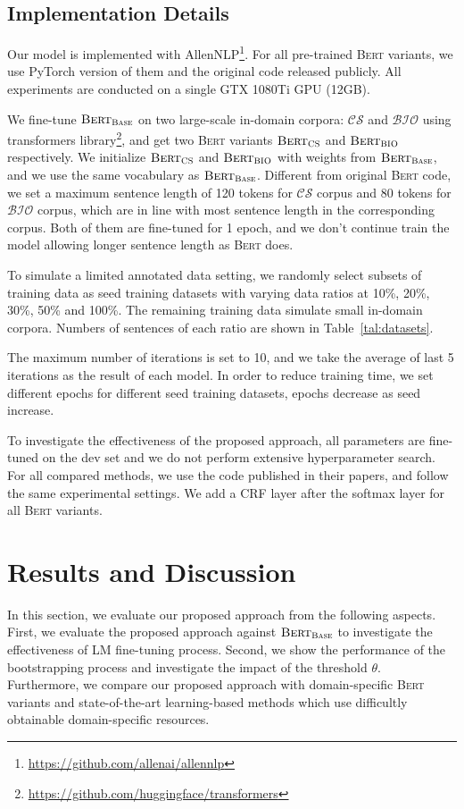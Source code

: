 \documentclass[10pt, conference, compsocconf]{IEEEtran}
\newcommand{\bert}{\textsc{Bert}\xspace}
\newcommand{\bio}{$\mathcal{BIO}$\xspace}
\newcommand{\cs}{$\mathcal{CS}$\xspace}
\newcommand{\bertcs}{$\bert_{\textsc{CS}}$\xspace}
\newcommand{\bertbio}{$\bert_{\textsc{BIO}}$\xspace}
\newcommand{\bertbase}{$\bert_{\textsc{Base}}$\xspace}
\begin{document}
\subsection{Implementation Details}
Our model is implemented with AllenNLP\footnote{\url{https://github.com/allenai/allennlp}}.
For all pre-trained \bert variants, we use PyTorch version of them and the 
original code released publicly. All experiments are conducted on a single 
GTX 1080Ti GPU (12GB). 

We fine-tune \bertbase on two large-scale in-domain corpora: \cs and \bio using transformers
library\footnote{\url{https://github.com/huggingface/transformers}}, and get 
two \bert variants \bertcs and \bertbio respectively.
We initialize \bertcs and \bertbio with weights from \bertbase, 
and we use the same vocabulary as \bertbase.
Different from original \bert code, we set a maximum sentence length 
of 120 tokens for \cs corpus and 80 tokens for \bio corpus, 
which are in line with most sentence length in the corresponding corpus.
Both of them are fine-tuned for 1 epoch, and we don't continue train the model 
allowing longer sentence length as \bert does.


To simulate a limited annotated data setting,
we randomly select subsets of training data as seed training datasets with varying data 
ratios at 10\%, 20\%, 30\%, 50\% and 100\%. The remaining training data simulate small in-domain corpora.
Numbers of sentences of each ratio are shown in Table~\ref{tal:datasets}.

The maximum number of iterations is set to 10, and we take the average of last 
5 iterations as the result of each model.
In order to reduce training time, we set different epochs for different seed training datasets, 
epochs decrease as seed increase.  

To investigate the effectiveness of the proposed approach, 
all parameters are fine-tuned on the dev set and we do not perform extensive hyperparameter search. 
For all compared methods, we use the code published in their papers, and follow the same experimental settings.
We add a CRF layer after the softmax layer for all \bert variants.

\section{Results and Discussion}
In this section, we evaluate our proposed approach from the following aspects.
First, we evaluate the proposed approach against \bertbase to investigate the effectiveness of LM fine-tuning process.
Second, we show the performance of the bootstrapping process and investigate the impact of the threshold $\theta$. 
Furthermore, we compare our proposed approach with domain-specific \bert variants and  state-of-the-art 
learning-based methods which use difficultly obtainable domain-specific resources.
\end{document}
